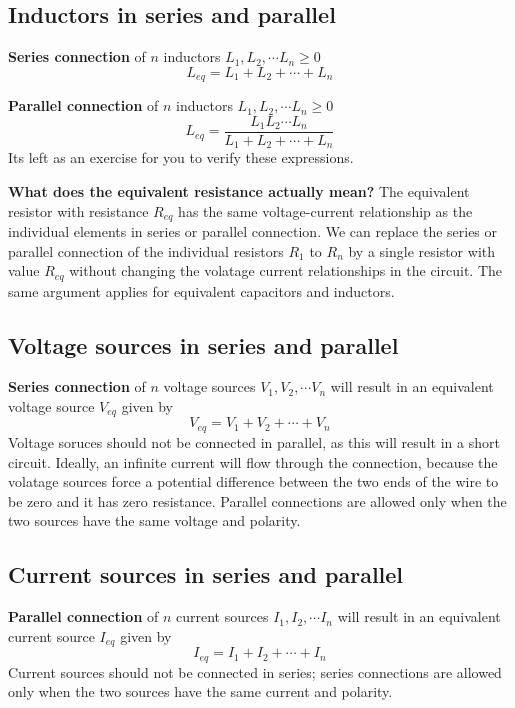 \subsection{Inductors in series and parallel}
\noindent\textbf{Series connection} of $n$ inductors $L_1, L_2, \cdots L_n \geq 0$
\begin{equation}
    L_{eq} = L_1 + L_2 + \cdots + L_n
    \label{eq:02-17}
\end{equation}

\noindent\textbf{Parallel connection} of $n$ inductors $L_1, L_2, \cdots L_n \geq 0$
\begin{equation}
    L_{eq} = \frac{L_1L_2\cdots L_n}{L_1 + L_2 + \cdots + L_n}
    \label{eq:02-18}
\end{equation}
Its left as an exercise for you to verify these expressions.

\noindent\textbf{What does the equivalent resistance actually mean?} The equivalent resistor with resistance $R_{eq}$ has the same voltage-current relationship as the individual elements in series or parallel connection. We can replace the series or parallel connection of the individual resistors $R_1$ to $R_n$ by a single resistor with value $R_{eq}$ without changing the volatage current relationships in the circuit. The same argument applies for equivalent capacitors and inductors.

\subsection{Voltage sources in series and parallel}
\noindent\textbf{Series connection} of $n$ voltage sources $V_1, V_2, \cdots V_n$ will result in an equivalent voltage source $V_{eq}$ given by
\begin{equation}
    V_{eq} = V_1 + V_2 + \cdots + V_n
    \label{eq:02-19}
\end{equation}
Voltage soruces should not be connected in parallel, as this will result in a short circuit. Ideally, an infinite current will flow through the connection, because the volatage sources force a potential difference between the two ends of the wire to be zero and it has zero resistance. Parallel connections are allowed only when the two sources have the same voltage and polarity.

\subsection{Current sources in series and parallel}
\noindent\textbf{Parallel connection} of $n$ current sources $I_1, I_2, \cdots I_n$ will
result in an equivalent current source $I_{eq}$ given by
\begin{equation}
    I_{eq} = I_1 + I_2 + \cdots + I_n
    \label{eq:02-20}
\end{equation}
Current sources should not be connected in series; series connections are allowed only when the two sources have the same current and polarity.

